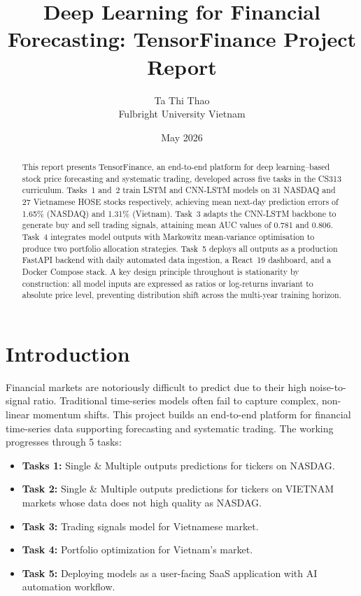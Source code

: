 \documentclass[12pt, a4paper]{article}
\title{\textbf{Deep Learning for Financial Forecasting: TensorFinance Project Report}}
\author{Ta Thi Thao \\ Fulbright University Vietnam}
\date{May 2026} %
\begin{document}
\maketitle


\begin{abstract}
This report presents TensorFinance, an end-to-end platform for deep
learning--based stock price forecasting and systematic trading, developed
across five tasks in the CS313 curriculum. Tasks~1 and~2 train LSTM and
CNN-LSTM models on 31 NASDAQ and 27 Vietnamese HOSE stocks respectively,
achieving mean next-day prediction errors of 1.65\% (NASDAQ) and 1.31\%
(Vietnam). Task~3 adapts the CNN-LSTM backbone to generate buy and sell
trading signals, attaining mean AUC values of 0.781 and 0.806. Task~4
integrates model outputs with Markowitz mean-variance optimisation to
produce two portfolio allocation strategies.
Task~5 deploys all outputs as a production FastAPI backend with daily
automated data ingestion, a React~19 dashboard, and a Docker Compose stack.
A key design principle throughout is stationarity by construction: all model
inputs are expressed as ratios or log-returns invariant to absolute price
level, preventing distribution shift across the multi-year training horizon.
\end{abstract}




\newpage
\tableofcontents
\newpage

\section{Introduction}

Financial markets are notoriously difficult to predict due to their high noise-to-signal ratio. Traditional time-series models often fail to capture complex, non-linear momentum shifts. This project builds an end-to-end platform for financial time-series data supporting forecasting and systematic trading. The working progresses through 5 tasks: 
\begin{itemize}
    \item \textbf{Tasks 1:} Single & Multiple outputs predictions for tickers on NASDAG.
    \item \textbf{Task 2: } Single & Multiple outputs predictions for tickers on VIETNAM markets whose data does not high quality as NASDAG.
    \item \textbf{Task 3:} Trading signals model for Vietnamese market.
    \item \textbf{Task 4:} Portfolio optimization for Vietnam's market.
    \item \textbf{Task 5:} Deploying models as a user-facing SaaS application with AI automation workflow.
    
\end{itemize}
\end{document}
